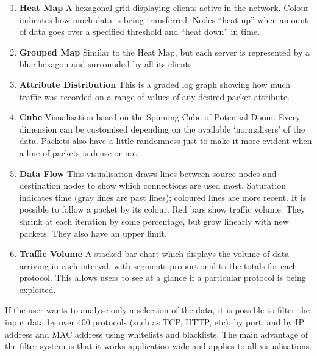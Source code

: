 \documentclass[12pt,a4paper]{article}
\begin{document}
			\begin{enumerate}
            
            \item \textbf{Heat Map} A hexagonal grid displaying clients active in the network. Colour indicates how much data is being transferred. Nodes ``heat up'' when amount of data goes over a specified threshold and ``heat down'' in time.

	        \item \textbf{Grouped Map} Similar to the Heat Map, but each server is represented by a blue hexagon and surrounded by all its clients.

            \item \textbf{Attribute Distribution} This is a graded log graph showing how much traffic was recorded on a range of values of any desired packet attribute.

            \item \textbf{Cube} Visualisation based on the Spinning Cube of Potential Doom. Every dimension can be customised depending on the available `normalisers' of the data. Packets also have a little randomness just to make it more evident when a line of packets is dense or not.

\clearpage

            \item \textbf{Data Flow} This visualisation draws lines between source nodes and destination nodes to show which connections are used most. Saturation indicates time (gray lines are past lines); coloured lines are more recent. It is possible to follow a packet by its colour. Red bars show traffic volume. They shrink at each iteration by some percentage, but grow linearly with new packets. They also have an upper limit.

            \item \textbf{Traffic Volume} A stacked bar chart which displays the volume of data arriving in each interval, with segments proportional to the totals for each protocol. This allows users to see at a glance if a particular protocol is being exploited.
            
            \end{enumerate}
			
			If the user wants to analyse only a selection of the data, it is possible to filter the input data by over 400 protocols (such as TCP, HTTP, etc), by port, and by IP address and MAC address using whitelists and blacklists. The main advantage of the filter system is that it works application-wide and applies to all visualisations.
\end{document}
